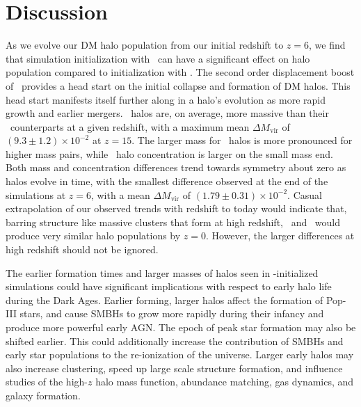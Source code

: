 
%
%

\section{Discussion}
\label{sec:2lpt--discussion}







As we evolve our DM halo population from our initial redshift to $z = 6$, we find that simulation initialization with \lpt\ can have a significant effect on halo population compared to initialization with \za.  The second order displacement boost of \lpt\ provides a head start on the initial collapse and formation of DM halos.  This head start manifests itself further along in a halo's evolution as more rapid growth and earlier mergers.  \lpt\ halos are, on average, more massive than their \za\ counterparts at a given redshift, with a maximum mean $\Delta M_{\mathrm{vir}}$ of $(9.3 \pm 1.2) \times 10^{-2}$ at $z = 15$.  The larger mass for \lpt\ halos is more pronounced for higher mass pairs, while \lpt\ halo concentration is larger on the small mass end.  Both mass and concentration differences trend towards symmetry about zero as halos evolve in time, with the smallest difference observed at the end of the simulations at $z = 6$, with a mean $\Delta M_{\mathrm{vir}}$ of $(1.79 \pm 0.31) \times 10^{-2}$.  Casual extrapolation of our observed trends with redshift to today would indicate that, barring structure like massive clusters that form at high redshift, \lpt\ and \za\ would produce very similar halo populations by $z = 0$.  However, the larger differences at high redshift should not be ignored.






The earlier formation times and larger masses of halos seen in \lpt-initialized simulations could have significant implications with respect to early halo life during the Dark Ages.  Earlier forming, larger halos affect the formation of Pop-III stars, and cause SMBHs to grow more rapidly during their infancy \citep{2012ApJ...761L...8H} and produce more powerful early AGN.  The epoch of peak star formation may also be shifted earlier.  This could additionally increase the contribution of SMBHs and early star populations to the re-ionization of the universe.  Larger early halos may also increase clustering, speed up large scale structure formation, and influence studies of the high-$z$ halo mass function, abundance matching, gas dynamics, and galaxy formation.

